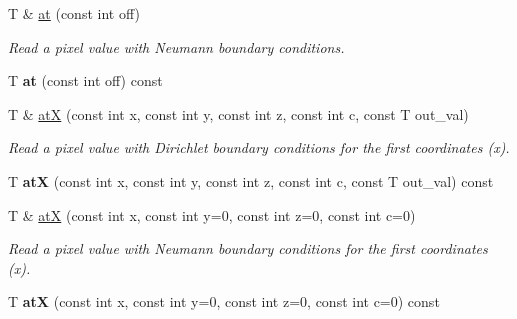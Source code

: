 \begin{DoxyCompactItemize}
\item 
\hypertarget{structcimg__library_1_1CImg_ad8cbb8d33ec7b0bacfbbade8a07ed556}{
T \& \hyperlink{structcimg__library_1_1CImg_ad8cbb8d33ec7b0bacfbbade8a07ed556}{at} (const int off)}
\label{structcimg__library_1_1CImg_ad8cbb8d33ec7b0bacfbbade8a07ed556}

\begin{DoxyCompactList}\small\item\em Read a pixel value with Neumann boundary conditions. \item\end{DoxyCompactList}\item 
\hypertarget{structcimg__library_1_1CImg_a1f256912e3ea22f28e89d7d3a4e2b5a8}{
T {\bfseries at} (const int off) const }
\label{structcimg__library_1_1CImg_a1f256912e3ea22f28e89d7d3a4e2b5a8}

\item 
\hypertarget{structcimg__library_1_1CImg_a70453f9c9e05380c3c90edb2554bdfc8}{
T \& \hyperlink{structcimg__library_1_1CImg_a70453f9c9e05380c3c90edb2554bdfc8}{atX} (const int x, const int y, const int z, const int c, const T out\_\-val)}
\label{structcimg__library_1_1CImg_a70453f9c9e05380c3c90edb2554bdfc8}

\begin{DoxyCompactList}\small\item\em Read a pixel value with Dirichlet boundary conditions for the first coordinates ({\ttfamily x}). \item\end{DoxyCompactList}\item 
\hypertarget{structcimg__library_1_1CImg_a224cb6526b29055c41408ae4b48586bc}{
T {\bfseries atX} (const int x, const int y, const int z, const int c, const T out\_\-val) const }
\label{structcimg__library_1_1CImg_a224cb6526b29055c41408ae4b48586bc}

\item 
\hypertarget{structcimg__library_1_1CImg_a9c1b7ee62d757ccbc1e9799d938f335d}{
T \& \hyperlink{structcimg__library_1_1CImg_a9c1b7ee62d757ccbc1e9799d938f335d}{atX} (const int x, const int y=0, const int z=0, const int c=0)}
\label{structcimg__library_1_1CImg_a9c1b7ee62d757ccbc1e9799d938f335d}

\begin{DoxyCompactList}\small\item\em Read a pixel value with Neumann boundary conditions for the first coordinates ({\ttfamily x}). \item\end{DoxyCompactList}\item 
\hypertarget{structcimg__library_1_1CImg_a7326c9557cd41d2be5b1e318f03bfa98}{
T {\bfseries atX} (const int x, const int y=0, const int z=0, const int c=0) const }
\label{structcimg__library_1_1CImg_a7326c9557cd41d2be5b1e318f03bfa98}


\end{DoxyCompactItemize}
